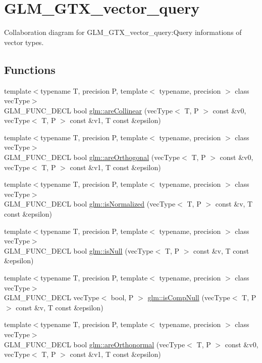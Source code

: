 \hypertarget{group__gtx__vector__query}{
\section{GLM\_\-GTX\_\-vector\_\-query}
\label{group__gtx__vector__query}
}


Collaboration diagram for GLM\_\-GTX\_\-vector\_\-query:Query informations of vector types.  
\subsection*{Functions}
\begin{CompactItemize}
\item 
{\footnotesize template$<$typename T, precision P, template$<$ typename, precision $>$ class vecType$>$ }\\GLM\_\-FUNC\_\-DECL bool \hyperlink{group__gtx__vector__query_gbfc6fa0b52f1ad33ffe31d41535f7069}{glm::areCollinear} (vecType$<$ T, P $>$ const \&v0, vecType$<$ T, P $>$ const \&v1, T const \&epsilon)
\item 
{\footnotesize template$<$typename T, precision P, template$<$ typename, precision $>$ class vecType$>$ }\\GLM\_\-FUNC\_\-DECL bool \hyperlink{group__gtx__vector__query_g9af1cd34fdb7c3cdeb11c0235fe7c468}{glm::areOrthogonal} (vecType$<$ T, P $>$ const \&v0, vecType$<$ T, P $>$ const \&v1, T const \&epsilon)
\item 
{\footnotesize template$<$typename T, precision P, template$<$ typename, precision $>$ class vecType$>$ }\\GLM\_\-FUNC\_\-DECL bool \hyperlink{group__gtx__vector__query_g70f64c6df21ad40303809d76b1474fbe}{glm::isNormalized} (vecType$<$ T, P $>$ const \&v, T const \&epsilon)
\item 
{\footnotesize template$<$typename T, precision P, template$<$ typename, precision $>$ class vecType$>$ }\\GLM\_\-FUNC\_\-DECL bool \hyperlink{group__gtx__vector__query_g368e458df5a70d885f5d8a87ec7b8ef8}{glm::isNull} (vecType$<$ T, P $>$ const \&v, T const \&epsilon)
\item 
{\footnotesize template$<$typename T, precision P, template$<$ typename, precision $>$ class vecType$>$ }\\GLM\_\-FUNC\_\-DECL vecType$<$ bool, P $>$ \hyperlink{group__gtx__vector__query_g91e10972d2d748d78f0a5f6234f8b088}{glm::isCompNull} (vecType$<$ T, P $>$ const \&v, T const \&epsilon)
\item 
{\footnotesize template$<$typename T, precision P, template$<$ typename, precision $>$ class vecType$>$ }\\GLM\_\-FUNC\_\-DECL bool \hyperlink{group__gtx__vector__query_g78e84684059effca3c44c549476db51a}{glm::areOrthonormal} (vecType$<$ T, P $>$ const \&v0, vecType$<$ T, P $>$ const \&v1, T const \&epsilon)
\end{CompactItemize}


